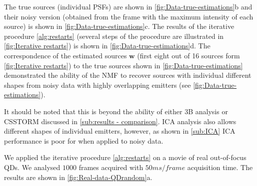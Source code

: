 The true sources (individual PSFs) are shown in \autoref{fig:Data-true-estimations}b and their noisy version (obtained from the frame with the maximum intensity of each source) is shown in \autoref{fig:Data-true-estimations}c. The results of the iterative procedure \autoref{alg:restarts} (several steps of the procedure are illustrated in \autoref{fig:Iterative restarts}) is shown in \autoref{fig:Data-true-estimations}d. The correspondence of the estimated sources $\bm{w}$ (first eight out of 16 sources form \autoref{fig:Iterative restarts}) to the true sources shown in \autoref{fig:Data-true-estimations} demonstrated the ability of the NMF to recover sources with individual different shapes from noisy data with highly overlapping emitters (see \autoref{fig:Data-true-estimations}). 

It should be noted that this is beyond the ability of either 3B analysis \cite{Cox2011} or CSSTORM \cite{Zhu2012} discussed in \autoref{sub:results - comparison}. ICA analysis also allows different shapes of individual emitters, however, as shown in \autoref{sub:ICA} ICA performance is poor for when applied to noisy data.   

We applied the iterative procedure \autoref{alg:restarts} on a movie of real out-of-focus QDs. We analysed $1000$ frames acquired with $50\unit{ms/frame}$ acquisition time. The results are shown in \autoref{fig:Real-data-QDrandom}a. 
 
